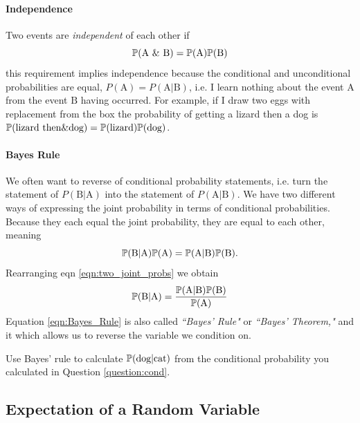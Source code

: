 \paragraph{Independence}
Two events are \emph{independent} of each other if
\begin{equation}
\P(\textrm{A \& B}) = \P(\textrm{A}) \P(\textrm{B}) \label{eqn:basic_indie}
\end{equation}
this requirement implies independence because the conditional and
unconditional probabilities are equal, $P(\textrm{A}) = P(\textrm{A} | \textrm{B})$, i.e. I learn
nothing about the event $\textrm{A}$ from the event $\textrm{B}$ having occurred. 
For example, if I draw two eggs with replacement from the box the
probability of getting a lizard then a dog is $\P(\textrm{lizard then} \& \textrm{dog}) =
\P(\textrm{lizard}) \P(\textrm{dog})$. 


\paragraph{Bayes Rule}
We often want to reverse of conditional probability statements,
i.e. turn the statement of $P(\textrm{B} | \textrm{A})$ into the statement of $P(\textrm{A} |
\textrm{B})$. 
We have two different ways of expressing the joint probability in terms of conditional probabilities. Because they each equal the joint probability, they are equal to each other, meaning
\begin{equation}
\P(\textrm{B} | \textrm{A}) \P(\textrm{A}) =  \P(\textrm{A} | \textrm{B}) \P(\textrm{B}) . \label{eqn:two_joint_probs}
 \end{equation}
Rearranging eqn \eqref{eqn:two_joint_probs} we obtain 
\begin{equation}
\P(\textrm{B} | \textrm{A}) =  \frac{\P(\textrm{A} | \textrm{B}) \P(\textrm{B}) }{\P(\textrm{A})} \label{eqn:Bayes_Rule}
 \end{equation}
Equation \eqref{eqn:Bayes_Rule} is also called \emph{``Bayes' Rule"} or \emph{``Bayes' Theorem,"} and it  which allows us to reverse the variable we
condition on. 
\begin{question}
Use Bayes' rule to calculate $\P(\textrm{dog} | \textrm{cat})$ from
the conditional probability you calculated in Question
\ref{question:cond}.\\
 \end{question}


\subsection*{Expectation of a Random Variable}

